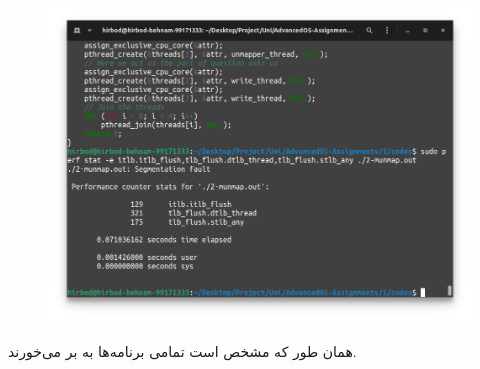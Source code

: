 \begin{figure}[H]
    \centering
    \includegraphics[scale=0.4]{pics/2-unmap-write-write.png}
\end{figure}
همان طور که مشخص است تمامی برنامه‌ها به
بر می‌خورند.


